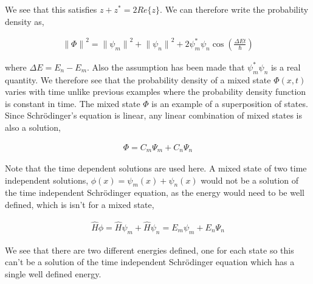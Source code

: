 \documentclass[11pt]{amsart}
\begin{document}
We see that this satisfies $z + z^* = 2 Re\{z\}$. We can therefore write the probability density as,

\begin{align*}
  {\|\Phi\|}^2 = {\|\psi_m\|}^2 + {\|\psi_n\|}^2 + 2\psi_m^* \psi_n \cos{\left(\frac{\Delta E t}{\hbar}\right)}
\end{align*}

where $\Delta E = E_n - E_m$. Also the assumption has been made that $\psi_m^*\psi_n$ is a real quantity. We therefore see that the probability density of a mixed state $\Phi(x, t)$ varies with time unlike previous examples where the probability density function is constant in time. The mixed state $\Phi$ is an example of a superposition of states. Since Schr\"{o}dinger's equation is linear, any linear combination of mixed states is also a solution,

\begin{align*}
  \Phi = C_m \Psi_m + C_n \Psi_n
\end{align*}

Note that the time dependent solutions are used here. A mixed state of two time independent solutions, $\phi(x) = \psi_m(x) + \psi_n(x)$ would not be a solution of the time independent Schr\"{o}dinger equation, as the energy would need to be well defined, which is isn't for a mixed state,

\begin{align*}
  \hat{H}\phi = \hat{H}\psi_m + \hat{H}\psi_n = E_m\psi_m + E_n\Psi_n
\end{align*}

We see that there are two different energies defined, one for each state so this can't be a solution of the time independent Schr\"{o}dinger equation which has a single well defined energy.
\end{document}
